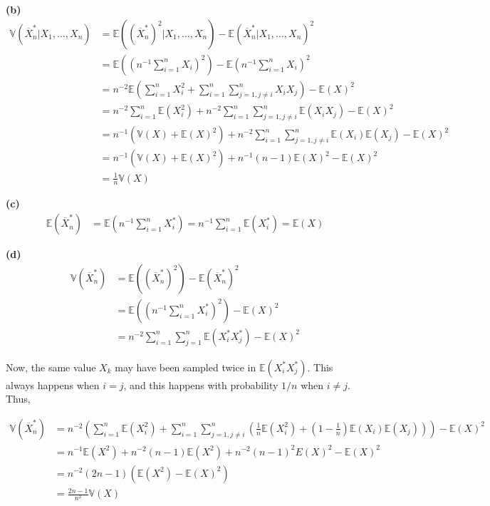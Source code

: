 \textbf{(b)} \begin{align*}
\mathbb{V}(\overline{X}_{n}^* | X_{1}, \dots, X_{n}) & =
\mathbb{E}((\overline{X}_{n}^*)^{2} | X_{1}, \dots, X_{n}) - \mathbb{E}(\overline{X}_{n}^* | X_{1}, \dots, X_{n})^{2} \\
&= \mathbb{E}\left(\left(n^{-1}\sum_{i=1}^{n}X_{i}\right)^{2}\right) - \mathbb{E}\left(n^{-1}\sum_{i=1}^{n}X_{i}\right)^{2} \\
&= n^{-2} \mathbb{E}\left(\sum_{i=1}^{n}X_{i}^{2} + \sum_{i=1}^{n} \sum_{j=1, j \neq i}^{n} X_{i} X_{j}\right) - \mathbb{E}(X)^{2} \\
&= n^{-2} \sum_{i=1}^{n} \mathbb{E}(X_{i}^{2}) + n^{-2} \sum_{i=1}^{n} \sum_{j=1, j \neq i}^{n} \mathbb{E}(X_{i} X_{j}) - \mathbb{E}(X)^{2}  \\
&= n^{-1} (\mathbb{V}(X) + \mathbb{E}(X)^{2}) + n^{-2} \sum_{i=1}^{n} \sum_{j=1, j \neq i}^{n} \mathbb{E}(X_{i}) \mathbb{E}(X_{j}) - \mathbb{E}(X)^{2} \\
&= n^{-1} (\mathbb{V}(X) + \mathbb{E}(X)^{2}) + n^{-1} (n - 1) \mathbb{E}(X)^{2} - \mathbb{E}(X)^{2} \\
&= \frac{1}{n}\mathbb{V}(X)
\end{align*}

\textbf{(c)} \begin{align*}
\mathbb{E}(\overline{X}_{n}^*) &= \mathbb{E}\left(n^{-1} \sum_{i=1}^{n}X_{i}^*\right) = n^{-1} \sum_{i=1}^{n} \mathbb{E}(X_{i}^*) = \mathbb{E}(X)
\end{align*}

\textbf{(d)} \begin{align*}
\mathbb{V}(\overline{X}_{n}^*) &= \mathbb{E}((\overline{X}_{n}^*)^{2}) - \mathbb{E}(\overline{X}_{n}^*)^{2} \\
&= \mathbb{E}\left(\left(n^{-1} \sum_{i=1}^{n}X_{i}^*\right)^{2}\right) - \mathbb{E}(X)^{2} \\
&= n^{-2} \sum_{i=1}^{n}\sum_{j=1}^{n} \mathbb{E}(X_{i}^* X_{j}^*) - \mathbb{E}(X)^{2}
\end{align*}

Now, the same value \(X_{k}\) may have been sampled twice in
\(\mathbb{E}(X_{i}^* X_{j}^*)\). This always happens when \(i = j\), and
this happens with probability \(1 / n\) when \(i \neq j\). Thus,

\begin{align*}
\mathbb{V}(\overline{X}_{n}^*) 
&= n^{-2} \left(\sum_{i=1}^{n} \mathbb{E}(X_{i}^{2}) + \sum_{i=1}^{n} \sum_{j=1, j \neq i}^{n} \left( \frac{1}{n} \mathbb{E}(X_{i}^{2}) + \left(1 - \frac{1}{n}\right)\mathbb{E}(X_{i})\mathbb{E}(X_{j})\right) \right) - \mathbb{E}(X)^{2} \\
&= n^{-1} \mathbb{E}(X^{2}) + n^{-2} (n-1) \mathbb{E}(X^{2}) + n^{-2}(n-1)^{2} E(X)^{2} - \mathbb{E}(X)^{2} \\
&= n^{-2} (2n - 1) \left( \mathbb{E}(X^{2}) - \mathbb{E}(X)^{2} \right) \\
&= \frac{2n - 1}{n^{2}} \mathbb{V}(X)
\end{align*}

